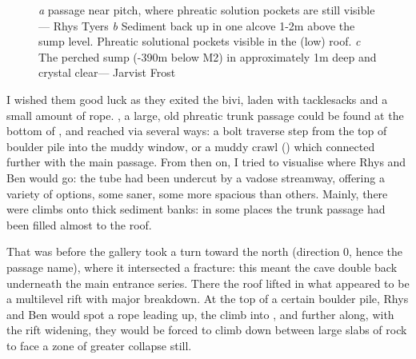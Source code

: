 \begin{figure*}[t!]
\checkoddpage \ifoddpage \forcerectofloat \else \forceversofloat \fi
\centering
\begin{subfigure}[t]{0.328\textwidth}
\centering
{}
 \caption{}\label{smer 0 dave}
\end{subfigure}
    \hfill
    \begin{subfigure}[t]{0.662\textwidth}
        \centering
        \caption{} \label{sump sediment}
    \end{subfigure}
    
    \vspace{0.3cm}
    \begin{subfigure}[t]{\textwidth}
    \centering
        \caption{} \label{sump of hearts}
    \end{subfigure}
    \caption{
    \emph{a} \protect{} passage near \protect{} pitch, where phreatic solution pockets are still visible --- Rhys Tyers
    \emph{b} Sediment back up in one alcove 1-2m above the sump level. Phreatic solutional pockets visible in the (low) roof.
    \emph{c} The perched sump (-390m below M2) in \protect{} approximately 1m deep and crystal clear--- Jarvist Frost}
\end{figure*}


I wished them good luck as they exited the bivi, laden with tacklesacks and a small amount of rope. , a large, old phreatic trunk passage could be found at the bottom of , and reached via several ways: a bolt traverse step from the top of boulder pile into the muddy window, or a muddy crawl () which connected further with the main passage. From then on, I tried to visualise where Rhys and Ben would go: the tube had been undercut by a vadose streamway, offering a variety of options, some saner, some more spacious than others. Mainly, there were climbs onto thick sediment banks: in some places the trunk passage had been filled almost to the roof. 

That was before the gallery took a turn toward the north (direction 0, hence the passage name), where it intersected a fracture: this meant the cave double back underneath the main  entrance series. There the roof lifted in what appeared to be a multilevel rift with major breakdown. At the top of a certain boulder pile, Rhys and Ben would spot a rope leading up, the climb into , and further along, with the rift widening, they would be forced to climb down between large slabs of rock to face a zone of greater collapse still. 

